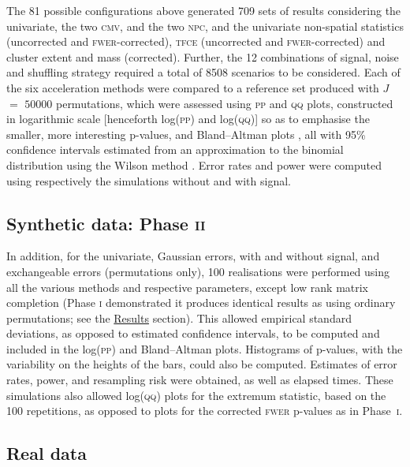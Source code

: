 The 81 possible configurations above generated 709 sets of results considering the univariate, the two \textsc{cmv}, and the two \textsc{npc}, and the univariate non-spatial statistics (uncorrected and \textsc{fwer}-corrected), \textsc{tfce} (uncorrected and \textsc{fwer}-corrected) and cluster extent and mass (corrected). Further, the 12 combinations of signal, noise and shuffling strategy required a total of 8508 scenarios to be considered. Each of the six acceleration methods were compared to a reference set produced with $J$ $=$ $50000$ permutations, which were assessed using \textsc{pp} and \textsc{qq} plots, constructed in logarithmic scale [henceforth log(\textsc{pp}) and log(\textsc{qq})] so as to emphasise the smaller, more interesting p-values, and Bland--Altman plots \citep{Bland1986}, all with 95\% confidence intervals estimated from an approximation to the binomial distribution using the Wilson method \citep{Wilson1927}. Error rates and power were computed using respectively the simulations without and with signal.

\subsection{Synthetic data: Phase \textsc{ii}}

In addition, for the univariate, Gaussian errors, with and without signal, and exchangeable errors (permutations only), 100 realisations were performed using all the various methods and respective parameters, except low rank matrix completion (Phase \textsc{i} demonstrated it produces identical results as using ordinary permutations; see the \href{sec:accel:results}{Results} section). This allowed empirical standard deviations, as opposed to estimated confidence intervals, to be computed and included in the log(\textsc{pp}) and Bland--Altman plots. Histograms of p-values, with the variability on the heights of the bars, could also be computed. Estimates of error rates, power, and resampling risk were obtained, as well as elapsed times. These simulations also allowed log(\textsc{qq}) plots for the extremum statistic, based on the 100 repetitions, as opposed to plots for the corrected \textsc{fwer} p-values as in Phase~\textsc{i}.

\subsection{Real data}


